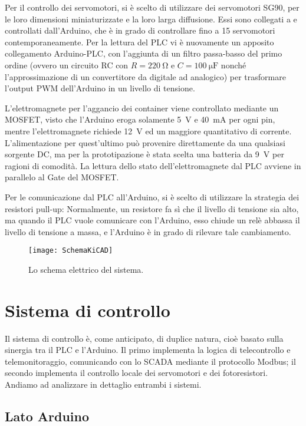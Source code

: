Per il controllo dei servomotori, si è scelto di utilizzare dei servomotori SG90, per le loro
dimensioni miniaturizzate e la loro larga diffusione. Essi sono collegati a e controllati
dall'Arduino, che è in grado di controllare fino a 15 servomotori contemporaneamente. Per la lettura
del PLC vi è nuovamente un apposito collegamento Arduino-PLC, con l'aggiunta di un filtro
passa-basso del primo ordine (ovvero un circuito RC con $R = \qty{220}{\ohm}$ e $C =
\qty{100}{\micro\farad}$ nonché l'approssimazione di un convertitore da digitale ad analogico) per
trasformare l'output PWM dell'Arduino in un livello di tensione.

L'elettromagnete per l'aggancio dei container viene controllato mediante un MOSFET, visto che
l'Arduino eroga solamente \qty{5}{\volt} e \qty{40}{\milli\ampere} per ogni pin, mentre
l'elettromagnete richiede \qty{12}{\volt} ed un maggiore quantitativo di corrente. L'alimentazione
per quest'ultimo può provenire direttamente da una qualsiasi sorgente DC, ma per la prototipazione è
stata scelta una batteria da \qty{9}{\volt} per ragioni di comodità. La lettura dello stato
dell'elettromagnete dal PLC avviene in parallelo al Gate del MOSFET.

Per le comunicazione dal PLC all'Arduino, si è scelto di utilizzare la strategia dei resistori
pull-up: Normalmente, un resistore fa sì che il livello di tensione sia alto, ma quando il PLC vuole
comunicare con l'Arduino, esso chiude un relè abbassa il livello di tensione a massa, e l'Arduino è
in grado di rilevare tale cambiamento.

\begin{figure*}[htbp]\centering
    \caption{Lo schema elettrico del sistema.}\label{fig:schema-elettrico}
    \texttt{[image: SchemaKiCAD]}
\end{figure*}

\section{Sistema di controllo}

Il sistema di controllo è, come anticipato, di duplice natura, cioè basato sulla sinergia tra il PLC
e l'Arduino. Il primo implementa la logica di telecontrollo e telemonitoraggio, comunicando con lo
SCADA mediante il protocollo Modbus; il secondo implementa il controllo locale dei servomotori e dei
fotoresistori. Andiamo ad analizzare in dettaglio entrambi i sistemi.

\subsection{Lato Arduino}


